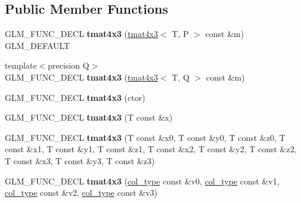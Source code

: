 \subsection*{Public Member Functions}
\begin{DoxyCompactItemize}
\item 
\hypertarget{structglm_1_1tmat4x3_acc3fecdeccf2378bb2193face5771c9c}{G\-L\-M\-\_\-\-F\-U\-N\-C\-\_\-\-D\-E\-C\-L {\bfseries tmat4x3} (\hyperlink{structglm_1_1tmat4x3}{tmat4x3}$<$ T, P $>$ const \&m) G\-L\-M\-\_\-\-D\-E\-F\-A\-U\-L\-T}\label{structglm_1_1tmat4x3_acc3fecdeccf2378bb2193face5771c9c}

\item 
\hypertarget{structglm_1_1tmat4x3_a1dadd893a6f4303c828c1703c01b6a82}{{\footnotesize template$<$precision Q$>$ }\\G\-L\-M\-\_\-\-F\-U\-N\-C\-\_\-\-D\-E\-C\-L {\bfseries tmat4x3} (\hyperlink{structglm_1_1tmat4x3}{tmat4x3}$<$ T, Q $>$ const \&m)}\label{structglm_1_1tmat4x3_a1dadd893a6f4303c828c1703c01b6a82}

\item 
\hypertarget{structglm_1_1tmat4x3_a119f8bccaee4c0f16164ce7e4a709f56}{G\-L\-M\-\_\-\-F\-U\-N\-C\-\_\-\-D\-E\-C\-L {\bfseries tmat4x3} (ctor)}\label{structglm_1_1tmat4x3_a119f8bccaee4c0f16164ce7e4a709f56}

\item 
\hypertarget{structglm_1_1tmat4x3_a9311ec06a9bad7de2503ad73350ef56c}{G\-L\-M\-\_\-\-F\-U\-N\-C\-\_\-\-D\-E\-C\-L {\bfseries tmat4x3} (T const \&x)}\label{structglm_1_1tmat4x3_a9311ec06a9bad7de2503ad73350ef56c}

\item 
\hypertarget{structglm_1_1tmat4x3_aaa45571f2683b4504c4f44389dd1b200}{G\-L\-M\-\_\-\-F\-U\-N\-C\-\_\-\-D\-E\-C\-L {\bfseries tmat4x3} (T const \&x0, T const \&y0, T const \&z0, T const \&x1, T const \&y1, T const \&z1, T const \&x2, T const \&y2, T const \&z2, T const \&x3, T const \&y3, T const \&z3)}\label{structglm_1_1tmat4x3_aaa45571f2683b4504c4f44389dd1b200}

\item 
\hypertarget{structglm_1_1tmat4x3_a0692a1ccb7171455fc48414a16bad1d1}{G\-L\-M\-\_\-\-F\-U\-N\-C\-\_\-\-D\-E\-C\-L {\bfseries tmat4x3} (\hyperlink{structglm_1_1tvec3}{col\-\_\-type} const \&v0, \hyperlink{structglm_1_1tvec3}{col\-\_\-type} const \&v1, \hyperlink{structglm_1_1tvec3}{col\-\_\-type} const \&v2, \hyperlink{structglm_1_1tvec3}{col\-\_\-type} const \&v3)}\label{structglm_1_1tmat4x3_a0692a1ccb7171455fc48414a16bad1d1}


\end{DoxyCompactItemize}
